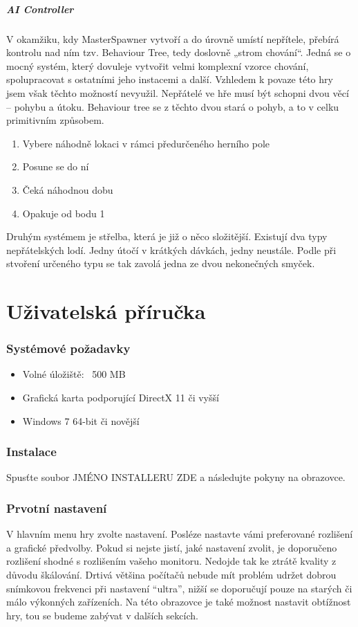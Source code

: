 \documentclass[12pt,a4paper,hidelinks]{article}
\begin{document}
\subsubsection{AI Controller}
V okamžiku, kdy MasterSpawner vytvoří a do úrovně umístí nepřítele, přebírá kontrolu nad ním tzv. Behaviour Tree, tedy doslovně „strom chování“. Jedná se o mocný systém, který dovuleje vytvořit velmi komplexní vzorce chování, spolupracovat s ostatními jeho instacemi a další. Vzhledem k povaze této hry jsem však těchto možností nevyužil.
Nepřátelé ve hře musí být schopni dvou věcí – pohybu a útoku. Behaviour tree se z těchto dvou stará o pohyb, a to v celku primitivním způsobem.
\begin{enumerate}
	\item Vybere náhodně lokaci v rámci předurčeného herního pole
	\item Posune se do ní
	\item Čeká náhodnou dobu
	\item Opakuje od bodu 1
\end{enumerate}
Druhým systémem je střelba, která je již o něco složitější.
Existují dva typy nepřátelských lodí. Jedny útočí v krátkých dávkách, jedny neustále. Podle při stvoření určeného typu se tak zavolá jedna ze dvou nekonečných smyček.


\clearpage
\part{Uživatelská příručka}
\section{Systémové požadavky}
\begin{itemize}
	\item Volné úložiště: ~500 MB
	\item Grafická karta podporující DirectX 11 či vyšší
	\item Windows 7 64-bit či novější
\end{itemize}
\section{Instalace}
Spusťte soubor JMÉNO INSTALLERU ZDE a následujte pokyny na obrazovce.
\section{Prvotní nastavení}
V hlavním menu hry zvolte nastavení. Posléze nastavte vámi preferované rozlišení a grafické předvolby.
Pokud si nejste jistí, jaké nastavení zvolit, je doporučeno rozlišení shodné s rozlišením vašeho monitoru. Nedojde tak ke ztrátě kvality z důvodu škálování. Drtivá většina počítačů nebude mít problém udržet dobrou snímkovou frekvenci při nastavení \enquote{ultra}, nižší se doporučují pouze na starých či málo výkonných zařízeních.
Na této obrazovce je také možnost nastavit obtížnost hry, tou se budeme zabývat v dalších sekcích.
\end{document}
